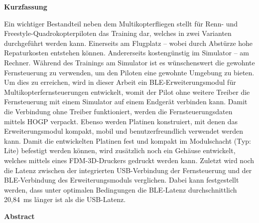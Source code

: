 
\pagestyle{empty}

\newenvironment{abstractpage}
  {\cleardoublepage\vspace*{\fill}\thispagestyle{empty}}
  {\vfill\cleardoublepage}
\newenvironment{abstractsection}[1]
  {\bigskip
   \begin{center}\bfseries#1\end{center}}
  {\par\bigskip}

\begin{abstractpage}
    \begin{abstractsection}{Kurzfassung}
      Ein wichtiger Bestandteil neben dem Multikopterfliegen stellt für Renn- und Freestyle-Quadrokopterpiloten das Training dar, welches in zwei Varianten durchgeführt werden kann. Einerseits am Flugplatz -- wobei durch Abstürze hohe Repaturkosten entstehen können. Andererseits kostengünstig im Simulator -- am Rechner. Während des Trainings am Simulator ist es wünschenswert die gewohnte Fernsteuerung zu verwenden, um den Piloten eine gewohnte Umgebung zu bieten. Um dies zu erreichen, wird in dieser Arbeit ein \acs{BLE}-Erweiterungsmodul für Multikopterfernsteuerungen entwickelt, womit der Pilot ohne weitere Treiber die Fernsteuerung mit einem Simulator auf einem Endgerät verbinden kann. Damit die Verbindung ohne Treiber funktioniert, werden die Fernsteuerungsdaten mittels \acs{HOGP} verpackt. Ebenso werden Platinen konstruiert, mit denen das Erweiterungsmodul kompakt, mobil und benutzerfreundlich verwendet werden kann. Damit die entwickelten Platinen fest und kompakt im Modulschacht (Typ: Lite) befestigt werden können, wird zusätzlich noch ein Gehäuse entwickelt, welches mittels eines \acs{FDM}-3D-Druckers gedruckt werden kann. Zuletzt wird noch die Latenz zwischen der integrierten USB-Verbindung der Fernsteuerung und der \acs{BLE}-Verbindung des Erweiterungsmoduls verglichen. Dabei kann festgestellt werden, dass unter optimalen Bedingungen die \acs{BLE}-Latenz durchschnittlich 20,84~ms länger ist als die USB-Latenz. 
    \end{abstractsection}

    \begin{abstractsection}{Abstract}
    \end{abstractsection}
\end{abstractpage}